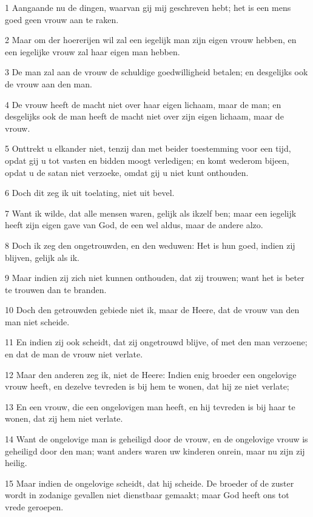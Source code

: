\par 1 Aangaande nu de dingen, waarvan gij mij geschreven hebt; het is een mens goed geen vrouw aan te raken.
\par 2 Maar om der hoererijen wil zal een iegelijk man zijn eigen vrouw hebben, en een iegelijke vrouw zal haar eigen man hebben.
\par 3 De man zal aan de vrouw de schuldige goedwilligheid betalen; en desgelijks ook de vrouw aan den man.
\par 4 De vrouw heeft de macht niet over haar eigen lichaam, maar de man; en desgelijks ook de man heeft de macht niet over zijn eigen lichaam, maar de vrouw.
\par 5 Onttrekt u elkander niet, tenzij dan met beider toestemming voor een tijd, opdat gij u tot vasten en bidden moogt verledigen; en komt wederom bijeen, opdat u de satan niet verzoeke, omdat gij u niet kunt onthouden.
\par 6 Doch dit zeg ik uit toelating, niet uit bevel.
\par 7 Want ik wilde, dat alle mensen waren, gelijk als ikzelf ben; maar een iegelijk heeft zijn eigen gave van God, de een wel aldus, maar de andere alzo.
\par 8 Doch ik zeg den ongetrouwden, en den weduwen: Het is hun goed, indien zij blijven, gelijk als ik.
\par 9 Maar indien zij zich niet kunnen onthouden, dat zij trouwen; want het is beter te trouwen dan te branden.
\par 10 Doch den getrouwden gebiede niet ik, maar de Heere, dat de vrouw van den man niet scheide.
\par 11 En indien zij ook scheidt, dat zij ongetrouwd blijve, of met den man verzoene; en dat de man de vrouw niet verlate.
\par 12 Maar den anderen zeg ik, niet de Heere: Indien enig broeder een ongelovige vrouw heeft, en dezelve tevreden is bij hem te wonen, dat hij ze niet verlate;
\par 13 En een vrouw, die een ongelovigen man heeft, en hij tevreden is bij haar te wonen, dat zij hem niet verlate.
\par 14 Want de ongelovige man is geheiligd door de vrouw, en de ongelovige vrouw is geheiligd door den man; want anders waren uw kinderen onrein, maar nu zijn zij heilig.
\par 15 Maar indien de ongelovige scheidt, dat hij scheide. De broeder of de zuster wordt in zodanige gevallen niet dienstbaar gemaakt; maar God heeft ons tot vrede geroepen.
